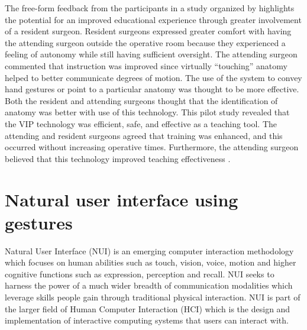 The free-form feedback from the participants in a study organized by \citet{Ponce2014} highlights the potential for an improved educational experience through greater involvement of a resident surgeon. Resident surgeons expressed greater comfort with having the attending surgeon outside the operative room because they experienced a feeling of autonomy while still having sufficient oversight. The attending surgeon commented that instruction was improved since virtually ``touching'' anatomy helped to better communicate degrees of motion. The use of the system to convey hand gestures or point to a particular anatomy was thought to be more effective. Both the resident and attending surgeons thought that the identification of anatomy was better with use of this technology. This pilot study revealed that the VIP technology was efficient, safe, and effective as a teaching tool. The attending and resident surgeons agreed that training was enhanced, and this occurred without increasing operative times. Furthermore, the attending surgeon believed that this technology improved teaching effectiveness \cite{Ponce2014}.

\section{Natural user interface using gestures}
Natural User Interface (NUI) is an emerging computer interaction methodology which focuses on human abilities such as touch, vision, voice, motion and higher cognitive functions such as expression, perception and recall. NUI seeks to harness the power of a much wider breadth of communication modalities which leverage skills people gain through traditional physical interaction. NUI is part of the larger field of Human Computer Interaction (HCI) which is the design and implementation of interactive computing systems that users can interact with. 

